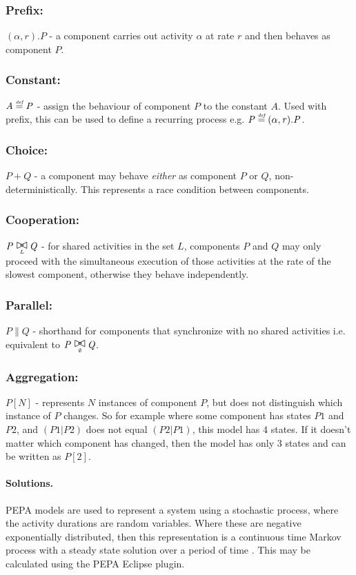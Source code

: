 \subsubsection{Prefix:} $(\mathit{\alpha},\mathit{r}).\mathit{P}$ - a component carries out activity $\mathit{\alpha}$ at rate $\mathit{r}$ and then behaves as component $\mathit{P}$.
\subsubsection{Constant:} $\mathit{A} \stackrel{\mbox{\em {\tiny def}}}{=} \mathit{P}$ - assign the behaviour of component $\mathit{P}$ to the constant $\mathit{A}$.  Used with prefix, this can be used to define a recurring process e.g. $\mathit{P} \stackrel{\mbox{\em {\tiny def}}}{=} (\mathit{\alpha},\mathit{r}).\mathit{P}$.
\subsubsection{Choice:} $\mathit{P} + \mathit{Q}$ - a component may behave {\itshape either} as component $\mathit{P}$ or $\mathit{Q}$, non-deterministically.  This represents a race condition between components.
\subsubsection{Cooperation:} $\mathit{P} \sync{L} \mathit{Q}$ - for shared activities in the set $\mathit{L}$, components $\mathit{P}$ and $\mathit{Q}$ may only proceed with the simultaneous execution of those activities at the rate of the slowest component, otherwise they behave independently.
\subsubsection{Parallel:} $\mathit{P} \parallel \mathit{Q}$ - shorthand for components that synchronize with no shared activities i.e. equivalent to $\mathit{P} \sync{\emptyset} \mathit{Q}$.
\subsubsection{Aggregation:} $\mathit{P}[N]$ - represents $\mathit{N}$ instances of component $\mathit{P}$, but does not distinguish which instance of $\mathit{P}$ changes.  So for example where some component has states $\mathit{P1}$ and $\mathit{P2}$, and $\mathit{(P1|P2)}$ does not equal $\mathit{(P2|P1)}$, this model has 4 states.  If it doesn't matter which component has changed, then the model has only 3 states and can be written as $\mathit{P}[2]$.

\paragraph{Solutions.} PEPA models are used to represent a system using a stochastic process, where the activity durations are random variables.  Where these are negative exponentially distributed, then this representation is a continuous time Markov process with a steady state solution over a period of time \cite{RN1051}.  This may be calculated using the PEPA Eclipse plugin.
